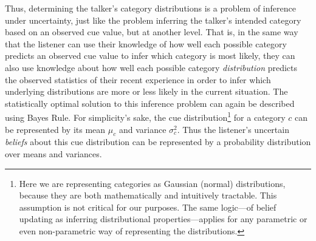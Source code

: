 Thus, determining the talker's category distributions is a problem of inference under uncertainty, just like the problem inferring the talker's intended category based on an observed cue value, but at another level.  That is, in the same way that the listener can use their knowledge of how well each possible category predicts an observed cue value to infer which category is most likely, they can also use knowledge about how well each possible category \emph{distribution} predicts the observed statistics of their recent experience in order to infer which underlying distributions are more or less likely in the current situation.  The statistically optimal solution to this inference problem can again be described using Bayes Rule.  For simplicity's sake, the cue distribution\footnote{Here we are representing categories as Gaussian (normal) distributions, because they are both mathematically and intuitively tractable.  This assumption is not critical for our purposes.  The same logic---of belief updating as inferring distributional properties---applies for any parametric or even non-parametric way of representing the distributions.} for a category $c$ can be represented by its mean $\mu_c$ and variance $\sigma_c^2$.  Thus the listener's uncertain \emph{beliefs} about this cue distribution can be represented by a probability distribution over means and variances.

